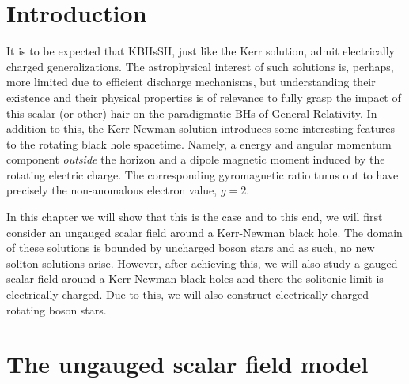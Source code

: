 \section{Introduction}

It is to be expected that KBHsSH, just like the Kerr solution, admit electrically charged generalizations.
The astrophysical interest of such solutions is, perhaps, more limited due to efficient discharge mechanisms, but understanding their existence and their physical properties is of relevance to fully grasp the impact of this scalar (or other) hair on the paradigmatic BHs of General Relativity.
In addition to this, the Kerr-Newman solution introduces some interesting features to the rotating black hole spacetime.
Namely, a energy and angular momentum component \emph{outside} the horizon and a dipole magnetic moment induced by the rotating electric charge.
The corresponding gyromagnetic ratio turns out to have precisely the non-anomalous electron value, $g=2$.

In this chapter we will show that this is the case and to this end, we will first consider an ungauged scalar field around a Kerr-Newman black hole.
The domain of these solutions is bounded by uncharged boson stars and as such, no new soliton solutions arise.
However, after achieving this, we will also study a gauged scalar field around a Kerr-Newman black holes and there the solitonic limit is electrically charged.
Due to this, we will also construct electrically charged rotating boson stars.

\section{The ungauged scalar field model}
\label{sec_mod_u}
